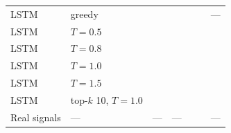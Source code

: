 \begin{tabular}{llccccc}
\addlinespace
LSTM & greedy & \generativeGenLstmGreedyStdRatio{} & \generativeGenLstmGreedyFracFlat{} & \generativeGenLstmGreedyWOneMv{} & \generativeGenLstmGreedyHrDefinedFrac{} & --- \\
LSTM & $T = 0.5$ & \generativeGenLstmTZeroFiveStdRatio{} & \generativeGenLstmTZeroFiveFracFlat{} & \generativeGenLstmTZeroFiveWOneMv{} & \generativeGenLstmTZeroFiveHrDefinedFrac{} & \generativeGenLstmTZeroFiveHrMae{} \\
LSTM & $T = 0.8$ & \generativeGenLstmTZeroEightStdRatio{} & \generativeGenLstmTZeroEightFracFlat{} & \generativeGenLstmTZeroEightWOneMv{} & \generativeGenLstmTZeroEightHrDefinedFrac{} & \generativeGenLstmTZeroEightHrMae{} \\
LSTM & $T = 1.0$ & \generativeGenLstmTOneZeroStdRatio{} & \generativeGenLstmTOneZeroFracFlat{} & \generativeGenLstmTOneZeroWOneMv{} & \generativeGenLstmTOneZeroHrDefinedFrac{} & \generativeGenLstmTOneZeroHrMae{} \\
LSTM & $T = 1.5$ & \generativeGenLstmTOneFiveStdRatio{} & \generativeGenLstmTOneFiveFracFlat{} & \generativeGenLstmTOneFiveWOneMv{} & \generativeGenLstmTOneFiveHrDefinedFrac{} & \generativeGenLstmTOneFiveHrMae{} \\
LSTM & top-$k$ 10, $T = 1.0$ & \generativeGenLstmTopkOneZeroStdRatio{} & \generativeGenLstmTopkOneZeroFracFlat{} & \generativeGenLstmTopkOneZeroWOneMv{} & \generativeGenLstmTopkOneZeroHrDefinedFrac{} & \generativeGenLstmTopkOneZeroHrMae{} \\
\midrule
Real signals & --- & --- & --- & \generativeRealWOneOtherMv{} & \generativeRealHrDefinedFrac{} & --- \\
\bottomrule
\end{tabular}
